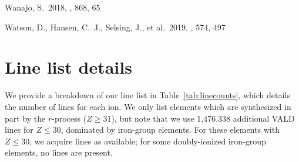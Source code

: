 \documentclass[twocolumn, twocolappendix]{aastex63}
\begin{document}
\begin{thebibliography}{}
 Wanajo, S.\ 2018, \apj, 868, 65






 Watson, D., Hansen, C.~J., Selsing, J., et al.\ 2019, \nat, 574, 497


















\end{thebibliography}


\appendix{}

\section{Line list details}\label{app:linelist}

We provide a breakdown of our line list in Table~\ref{tab:linecounts}, which details the number of lines for each ion. We only list elements which are synthesized in part by the $r$-process ($Z \geqslant 31$), but note that we use 1,476,338 additional VALD lines for $Z \leqslant 30$, dominated by iron-group elements. For these elements with $Z \leqslant 30$, we acquire lines as available; for some doubly-ionized iron-group elements, no lines are present.
\end{document}
